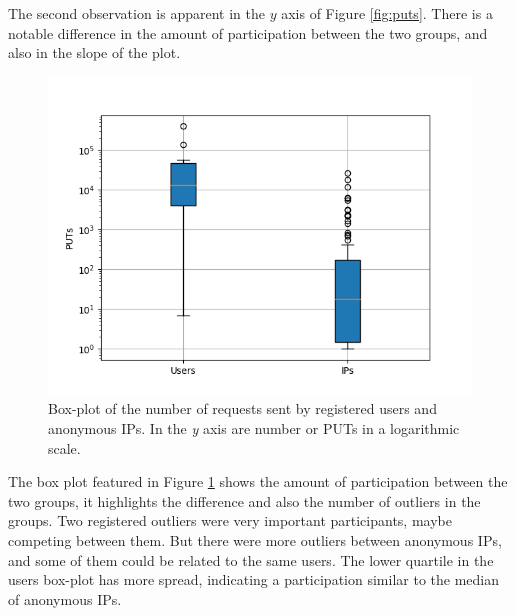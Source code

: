 \documentclass{llncs}
\begin{document}
The second observation is apparent in the $y$ axis of Figure
\ref{fig:puts}. There is a notable difference in the amount of
participation between the two groups, and also in the slope of the
plot. %

%
\begin{figure}[htb]
    \centering
        \includegraphics[width=5in]{img/puts_box.png}
    \caption{ Box-plot of the number of requests sent by registered users and anonymous IPs.
     In the \emph{y} axis are number or PUTs in a logarithmic scale.
    }
    \label{fig:box}
\end{figure}
%
The box plot featured in Figure \ref{fig:box} shows the amount of participation between the two groups, it highlights
the difference and also the number of outliers in the groups. Two registered
outliers were very important participants, maybe competing between them. But
there were more outliers between anonymous IPs, and some of them could be related to the same users. The lower quartile in the users box-plot has more
spread, indicating a participation similar to the median of anonymous IPs.
\end{document}
